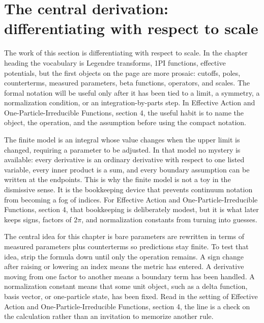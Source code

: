 \section{The central derivation: differentiating with respect to scale}













The work of this section is differentiating with respect to scale.  In the chapter heading the vocabulary is Legendre transforms, 1PI functions, effective potentials, but the first objects on the page are more prosaic: cutoffs, poles, counterterms, measured parameters, beta functions, operators, and scales.  The formal notation will be useful only after it has been tied to a limit, a symmetry, a normalization condition, or an integration-by-parts step.  In Effective Action and One-Particle-Irreducible Functions, section 4, the useful habit is to name the object, the operation, and the assumption before using the compact notation.

The finite model is an integral whose value changes when the upper limit is changed, requiring a parameter to be adjusted.  In that model no mystery is available: every derivative is an ordinary derivative with respect to one listed variable, every inner product is a sum, and every boundary assumption can be written at the endpoints.  This is why the finite model is not a toy in the dismissive sense.  It is the bookkeeping device that prevents continuum notation from becoming a fog of indices.  For Effective Action and One-Particle-Irreducible Functions, section 4, that bookkeeping is deliberately modest, but it is what later keeps signs, factors of \(2\pi\), and normalization constants from turning into guesses.

The central idea for this chapter is bare parameters are rewritten in terms of measured parameters plus counterterms so predictions stay finite.  To test that idea, strip the formula down until only the operation remains.  A sign change after raising or lowering an index means the metric has entered.  A derivative moving from one factor to another means a boundary term has been handled.  A normalization constant means that some unit object, such as a delta function, basis vector, or one-particle state, has been fixed.  Read in the setting of Effective Action and One-Particle-Irreducible Functions, section 4, the line is a check on the calculation rather than an invitation to memorize another rule.

